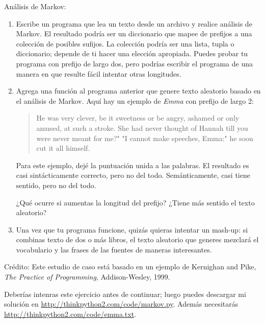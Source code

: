 \documentclass[10pt]{book}
\begin{document}
\begin{exercise}

Análisis de Markov:

\begin{enumerate}

\item Escribe un programa que lea un texto desde un archivo y realice análisis
de Markov.  El resultado podría ser un diccionario que mapee de
prefijos a una colección de posibles sufijos.  La colección
podría ser una lista, tupla o diccionario; depende de ti hacer
una elección apropiada.  Puedes probar tu programa con prefijo
de largo dos, pero podrías escribir el programa de una manera en que resulte
fácil intentar otras longitudes.

\item Agrega una función al programa anterior que genere texto aleatorio
basado en el análisis de Markov.  Aquí hay un ejemplo de {\em Emma}
con prefijo de largo 2:

\begin{quote}
He was very clever, be it sweetness or be angry, ashamed or only
amused, at such a stroke. She had never thought of Hannah till you
were never meant for me?" "I cannot make speeches, Emma:" he soon cut
it all himself.
\end{quote}

Para este ejemplo, dejé la puntuación unida a las palabras.
El resultado es casi sintácticamente correcto, pero no del todo.
Semánticamente, casi tiene sentido, pero no del todo.

¿Qué ocurre si aumentas la longitud del prefijo?  ¿Tiene más sentido
el texto aleatorio?

\item Una vez que tu programa funcione, quizás quieras intentar un mash-up:
si combinas texto de dos o más libros, el texto aleatorio
que generes mezclará el vocabulario y las frases de
las fuentes de maneras interesantes.

\end{enumerate}

Crédito: Este estudio de caso está basado en un ejemplo de Kernighan and
Pike, {\em The Practice of Programming}, Addison-Wesley, 1999.

\end{exercise}

Deberías intenras este ejercicio antes de continuar; luego puedes
descargar mi solución en \url{http://thinkpython2.com/code/markov.py}.
Además necesitarás \url{http://thinkpython2.com/code/emma.txt}.
\end{document}
